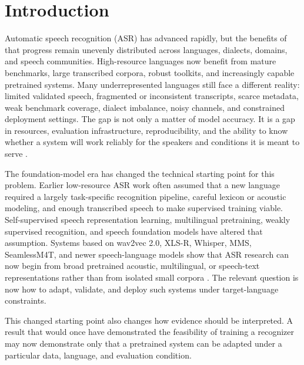 \documentclass[pdflatex,sn-basic,iicol]{sn-jnl}
\theoremstyle{thmstyleone}
\theoremstyle{thmstyletwo}
\theoremstyle{thmstylethree}
\begin{document}

\maketitle

\section{Introduction}

Automatic speech recognition (ASR) has advanced rapidly, but the benefits of that progress remain unevenly distributed across languages, dialects, domains, and speech communities. High-resource languages now benefit from mature benchmarks, large transcribed corpora, robust toolkits, and increasingly capable pretrained systems. Many underrepresented languages still face a different reality: limited validated speech, fragmented or inconsistent transcripts, scarce metadata, weak benchmark coverage, dialect imbalance, noisy channels, and constrained deployment settings. The gap is not only a matter of model accuracy. It is a gap in resources, evaluation infrastructure, reproducibility, and the ability to know whether a system will work reliably for the speakers and conditions it is meant to serve \citep{besacier2014_underresourced_asr_survey,ardila2020commonvoice,conneau2022fleurs,shi2023mlsuperb}.

The foundation-model era has changed the technical starting point for this problem. Earlier low-resource ASR work often assumed that a new language required a largely task-specific recognition pipeline, careful lexicon or acoustic modeling, and enough transcribed speech to make supervised training viable. Self-supervised speech representation learning, multilingual pretraining, weakly supervised recognition, and speech foundation models have altered that assumption. Systems based on wav2vec 2.0, XLS-R, Whisper, MMS, SeamlessM4T, and newer speech-language models show that ASR research can now begin from broad pretrained acoustic, multilingual, or speech-text representations rather than from isolated small corpora \citep{baevski2020wav2vec2,babu22_interspeech,pmlr-v202-radford23a,pratap2024mms,seamless2025_joint_speech_text_mt,tian25b_interspeech}. The relevant question is now how to adapt, validate, and deploy such systems under target-language constraints.

This changed starting point also changes how evidence should be interpreted. A result that would once have demonstrated the feasibility of training a recognizer may now demonstrate only that a pretrained system can be adapted under a particular data, language, and evaluation condition.
\end{document}
